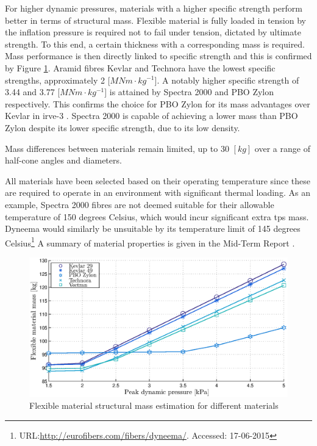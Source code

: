 For higher dynamic pressures, materials with a higher specific strength perform better in terms of structural mass. Flexible material is fully loaded in tension by the inflation pressure is required not to fail under tension, dictated by ultimate strength. To this end, a certain thickness with a corresponding mass is required. Mass performance is then directly linked to specific strength and this is confirmed by Figure \ref{fig:mat}. Aramid fibres Kevlar and Technora have the lowest specific strengths, approximately 2 [$MNm \cdot kg^{-1}$]. A notably higher specific strength of 3.44 and 3.77 [$MNm \cdot kg^{-1}$] is attained by Spectra 2000 and PBO Zylon respectively. This confirms the choice for PBO Zylon for its mass advantages over Kevlar in \gls{irve}-3 \cite{Dillman2012a}. Spectra 2000 is capable of achieving a lower mass than PBO Zylon despite its lower specific strength, due to its low density. 

Mass differences between materials remain limited, up to 30 $[kg]$ over a range of half-cone angles and diameters.

All materials have been selected based on their operating temperature since these are required to operate in an environment with significant thermal loading. As an example, Spectra 2000 fibres are not deemed suitable for their allowable temperature of 150 degrees Celsius, which would incur significant extra \acrfull{tps} mass. Dyneema would similarly be unsuitable by its temperature limit of 145 degrees Celsius\footnote{URL:\url{http://eurofibers.com/fibers/dyneema/}. Accessed: 17-06-2015} A summary of material properties is given in the Mid-Term Report \cite[p.64]{Balasooriyan2015b}. 

\begin{figure}[h]
	\centering
	\includegraphics[width=1.0\textwidth]{./Figure/Structure/material_test2.eps}
	\caption{Flexible material structural mass estimation for different materials}
	\label{fig:mat}
\end{figure}

